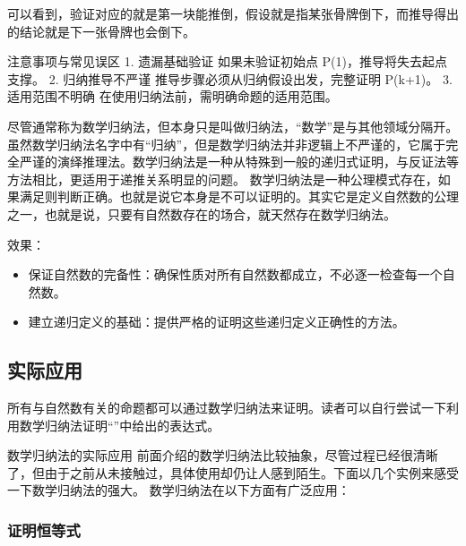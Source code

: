 可以看到，验证对应的就是第一块能推倒，假设就是指某张骨牌倒下，而推导得出的结论就是下一张骨牌也会倒下。

注意事项与常见误区
	1.	遗漏基础验证
如果未验证初始点 P(1)，推导将失去起点支撑。
	2.	归纳推导不严谨
推导步骤必须从归纳假设出发，完整证明 P(k+1)。
	3.	适用范围不明确
在使用归纳法前，需明确命题的适用范围。

尽管通常称为数学归纳法，但本身只是叫做归纳法，“数学”是与其他领域分隔开。虽然数学归纳法名字中有“归纳”，但是数学归纳法并非逻辑上不严谨的，它属于完全严谨的演绎推理法。数学归纳法是一种从特殊到一般的递归式证明，与反证法等方法相比，更适用于递推关系明显的问题。
数学归纳法是一种公理模式存在，如果满足则判断正确。也就是说它本身是不可以证明的。其实它是定义自然数的公理之一，也就是说，只要有自然数存在的场合，就天然存在数学归纳法。

效果：
\begin{itemize}
\item 保证自然数的完备性：确保性质对所有自然数都成立，不必逐一检查每一个自然数。
\item 建立递归定义的基础：提供严格的证明这些递归定义正确性的方法。
\end{itemize}
\subsection{实际应用}


所有与自然数有关的命题都可以通过数学归纳法来证明。读者可以自行尝试一下利用数学归纳法证明“”中给出的表达式。

数学归纳法的实际应用
前面介绍的数学归纳法比较抽象，尽管过程已经很清晰了，但由于之前从未接触过，具体使用却仍让人感到陌生。下面以几个实例来感受一下数学归纳法的强大。
数学归纳法在以下方面有广泛应用：

\subsubsection{证明恒等式}

